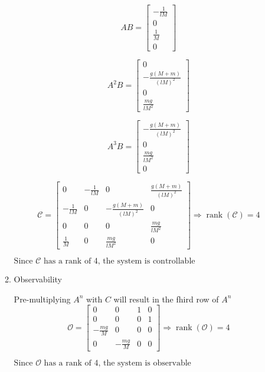 \documentclass{article}
\begin{document}
\begin{enumerate}[label=\alph*)]
\begin{enumerate}[label=\roman*)]
    \[
    AB = 
    \begin{bmatrix}
        -\frac{1}{lM} \\
        0 \\
        \frac{1}{M} \\
        0 
    \end{bmatrix}
    \]

    \[
    A^2B = 
    \begin{bmatrix}
        0 \\
        -\frac{g(M+m)}{(lM)^2} \\
        0 \\
        \frac{mg}{lM^2}
    \end{bmatrix}
    \]

    \[
    A^3B = 
    \begin{bmatrix}
        -\frac{g(M+m)}{(lM)^2} \\
        0 \\
        \frac{mg}{lM^2} \\
        0
    \end{bmatrix}
    \]

    \[
    \mathcal{C} = 
    \begin{bmatrix}
         0 & -\frac{1}{lM} & 0 & \frac{g(M+m)}{(lM)^2} \\
        -\frac{1}{lM} & 0 & -\frac{g(M+m)}{(lM)^2} & 0 \\
        0 & 0 & 0 & \frac{mg}{lM^2} \\
        \frac{1}{M} & 0 & \frac{mg}{lM^2} & 0 
    \end{bmatrix}
    \Rightarrow \operatorname{rank}(\mathcal{C}) = 4
    \]

    $\boxed{\text{Since $\mathcal{C}$ has a rank of 4, the system is controllable}}$


    \item Observability
    
    Pre-multiplying $A^n$ with $C$ will result in the fhird row of $A^n$
    \[
    \mathcal{O} = 
    \begin{bmatrix}
        0 & 0 & 1 & 0 \\
        0 & 0 & 0 & 1 \\
        -\frac{mg}{M} & 0 & 0 & 0 \\
        0 & -\frac{mg}{M} & 0 & 0
    \end{bmatrix}
    \Rightarrow \operatorname{rank}(\mathcal{O}) = 4
    \]

    $\boxed{\text{Since $\mathcal{O}$ has a rank of 4, the system is observable}}$
    
    \end{enumerate}
\end{enumerate}
\end{document}
